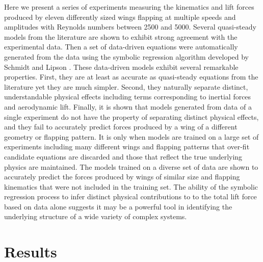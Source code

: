 \documentclass{article}
\begin{document}
Here we present a series of experiments measuring the kinematics and lift forces produced by eleven
differently sized wings flapping at multiple speeds and amplitudes with Reynolds numbers between
2500 and 5000. Several quasi-steady models from the literature are shown to exhibit strong agreement
with the experimental data.  Then a set of data-driven equations were automatically generated from
the data using the symbolic regression algorithm developed by Schmidt and Lipson \cite{schmidt2009distilling}.
These data-driven models exhibit several remarkable properties.  First, they are at least as
accurate as quasi-steady equations from the literature yet they are much simpler.  Second, they
naturally separate distinct, understandable physical effects including terms corresponding to
inertial forces and aerodynamic lift.  Finally, it is shown that models generated from data of a
single experiment do not have the property of separating distinct physical effects, and they fail to
accurately predict forces produced by a wing of a different geometry or flapping pattern.  It is
only when models are trained on a large set of experiments including many different wings and
flapping patterns that over-fit candidate equations are discarded and those that reflect the true
underlying physics are maintained.  The models trained on a diverse set of data are shown to
accurately predict the forces produced by wings of similar size and flapping kinematics that were
not included in the training set. The ability of the symbolic regression process to infer distinct
physical contributions to to the total lift force based on data alone suggests it may be a powerful
tool in identifying the underlying structure of a wide variety of complex systems.

\section*{Results}

%
%
%
%
%  
\end{document}
